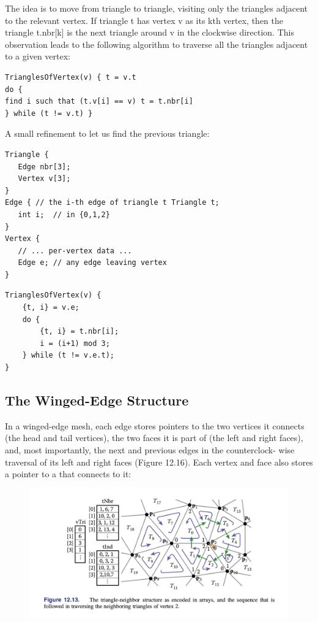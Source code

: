 \documentclass[11pt]{article}
\numberwithin{equation}{section}
\begin{document}
The idea is to move from triangle to triangle, visiting only the triangles adjacent to the relevant vertex. If triangle t has vertex v as its kth vertex, then the triangle t.nbr[k] is the next triangle around v in the clockwise direction. This observation leads to the following algorithm to traverse all the triangles adjacent to a given vertex:
\begin{framed}
\begin{verbatim}
TrianglesOfVertex(v) { t = v.t
do {
find i such that (t.v[i] == v) t = t.nbr[i]
} while (t != v.t) }
\end{verbatim}
\end{framed}
A small refinement to let us find the previous triangle:
\begin{framed}
\begin{verbatim}
Triangle {
   Edge nbr[3];
   Vertex v[3];
}
Edge { // the i-th edge of triangle t Triangle t;
   int i;  // in {0,1,2}
}
Vertex {
   // ... per-vertex data ...
   Edge e; // any edge leaving vertex
}

\end{verbatim}
\end{framed}

\begin{framed}
\begin{verbatim}
TrianglesOfVertex(v) { 
	{t, i} = v.e;
	do {
		{t, i} = t.nbr[i];
		i = (i+1) mod 3;
	} while (t != v.e.t);
}

\end{verbatim}
\end{framed}

\subsection{The Winged-Edge Structure}
In a winged-edge mesh, each edge stores pointers to the two vertices it connects (the head and tail vertices), the two faces it is part of (the left and right faces), and, most importantly, the next and previous edges in the counterclock- wise traversal of its left and right faces (Figure 12.16). Each vertex and face also stores a pointer to a  that connects to it:
\begin{figure}[H]
	\centering
	\includegraphics[scale=0.4]{p21}
\end{figure}
\end{document}
